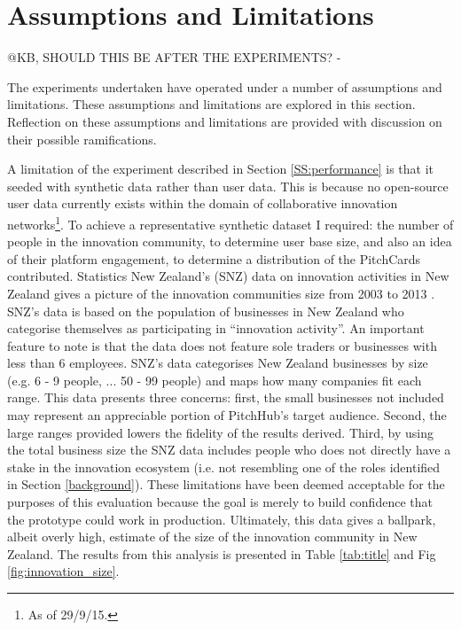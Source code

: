 \section{Assumptions and Limitations}
@KB, SHOULD THIS BE AFTER THE EXPERIMENTS? - 

The experiments undertaken have operated under a number of assumptions and limitations. These assumptions and limitations are explored in this section. Reflection on these assumptions and limitations are provided with discussion on their possible ramifications.

A limitation of the experiment described in Section \ref{SS:performance} is that it seeded with synthetic data rather than user data. This is because no open-source user data currently exists within the domain of collaborative innovation networks\footnote{As of 29/9/15.}. To achieve a representative synthetic dataset I required: the number of people in the innovation community, to determine user base size, and also an idea of their platform engagement, to determine a distribution of the PitchCards contributed. Statistics New Zealand's (SNZ) data on innovation activities in New Zealand gives a picture of the innovation communities size from 2003 to 2013 \cite{Innov5:online}. 
SNZ's data is based on the population of businesses in New Zealand who categorise themselves as participating in ``innovation activity''. An important feature to note is that the data does not feature sole traders or businesses with less than 6 employees. SNZ's data categorises New Zealand businesses by size (e.g. 6 - 9 people, ... 50 - 99 people) and maps how many companies fit each range. 
This data presents three concerns: first, the small businesses not included may represent an appreciable portion of PitchHub's target audience. Second, the large ranges provided lowers the fidelity of the results derived. Third, by using the total business size the SNZ data includes people who does not directly have a stake in the innovation ecosystem (i.e. not resembling one of the roles identified in Section \ref{background}). These limitations have been deemed acceptable for the purposes of this evaluation because the goal is merely to build confidence that the prototype could work in production. Ultimately, this data gives a ballpark, albeit overly high, estimate of the size of the innovation community in New Zealand. The results from this analysis is presented in Table \ref{tab:title} and Fig \ref{fig:innovation_size}.

